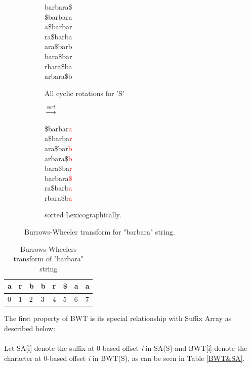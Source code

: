 \documentclass[11pt,a4paper]{report}
\begin{document}
\begin{figure}[H]
\centering
\begin{subfigure}{.5\textwidth}
  \centering
barbara\$\\
\$barbara\\
a\$barbar\\
ra\$barba\\
ara\$barb\\
bara\$bar\\
rbara\$ba\\
arbara\$b
  \caption{All cyclic rotations for 'S'}
  \label{fig:barbaraBWT1}
\end{subfigure}%
\begin{subfigure}{.1\textwidth}
  \centering
$\xrightarrow{sort}$
\label{fig:sub1}
\end{subfigure}%
\begin{subfigure}{.5\textwidth}
  \centering
\$barbar\textcolor{red}{a}\\
a\$barba\textcolor{red}{r}\\
ara\$bar\textcolor{red}{b}\\
arbara\$\textcolor{red}{b}\\
bara\$ba\textcolor{red}{r}\\
barbara\textcolor{red}{\$}\\
ra\$barb\textcolor{red}{a}\\
rbara\$b\textcolor{red}{a}
 \caption{sorted  Lexicographically.}
  \label{fig:Burrows-Wheeler transform}
\end{subfigure}
\caption{Burrows-Wheeler transform for "barbara" string.}
\label{barbaraBWT}
\end{figure}




\begin{table}[h]
 \centering
  \begin{tabular}{ | p{0.5cm} | p{0.5cm} | p{0.5cm} |p{0.5cm} 
  |p{0.5cm} |p{0.5cm} |p{0.5cm} |p{0.5cm} |}
    \hline
  \textbf{a} & \textbf{r} &\textbf{b}  &\textbf{b} &\textbf{r} 
  &\textbf{\$} &\textbf{a} &\textbf{a}\\ \hline
       0 & 1 &2&3&4&5&6&7 \\ \hline
      
   \end{tabular}
\caption{Burrows-Wheelers transform of "barbara" string}
\label{BWT-barbara}
\end{table}



The first property of BWT is its special relationship with Suffix 
Array as described below: \\\\
Let SA[i] denote the suffix at 0-based offset \emph{i} in SA(S)
and BWT[i] denote the character at 0-based offset \emph{i} in 
BWT(S), as can be seen in Table \ref{BWT&SA}\cite{bwt}.\\
\end{document}
